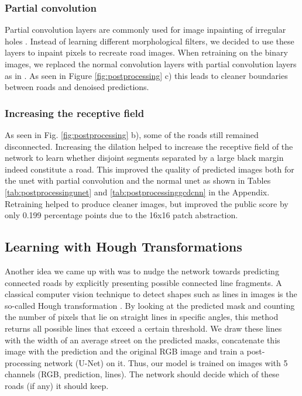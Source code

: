 \subsubsection{Partial convolution} 
Partial convolution layers are commonly used for image inpainting of irregular holes \cite{partialconv}. Instead of learning different morphological filters, we decided to use these layers to inpaint pixels to recreate road images.
When retraining on the binary images, we replaced the normal convolution layers with partial convolution layers as in \cite{partialconv}. 
As seen in Figure \ref{fig:postprocessing} c) this leads to cleaner boundaries between roads and denoised predictions.

\subsubsection{Increasing the receptive field} As seen in Fig. \ref{fig:postprocessing} b), some of the roads still remained disconnected. Increasing the dilation helped to increase the receptive field of the network to learn whether disjoint segments separated by a large black margin indeed constitute a road. This improved the quality of predicted images both for the \acrshort{unet} with partial convolution and the normal \acrshort{unet} as shown in Tables \ref{tab:postprocessingunet} and \ref{tab:postprocessinggcdcnn} in the Appendix. Retraining helped to produce cleaner images, but improved the public score by only 0.199 percentage points due to the 16x16 patch abstraction.

\subsection{Learning with Hough Transformations}
 Another idea we came up with was to nudge the network towards predicting connected roads by explicitly presenting possible connected line fragments. A classical computer vision technique to detect shapes such as lines in images is the so-called Hough transformation \cite{hough}. By looking at the predicted mask and counting the number of pixels that lie on straight lines in specific angles, this method returns all possible lines that exceed a certain threshold. We draw these lines with the width of an average street on the predicted masks, concatenate this image with the prediction and the original RGB image and train a post-processing network (U-Net) on it. Thus, our model is trained on images with 5 channels (RGB, prediction, lines). The network should decide which of these roads (if any) it should keep. 

